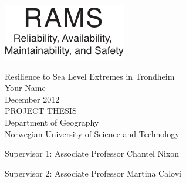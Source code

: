 \thispagestyle{empty}
\includegraphics[scale=1.1]{fig/rams}
\mbox{}\\[6pc]
\begin{center}
\Huge{Resilience to Sea Level Extremes in Trondheim}\\[2pc]

\Large{Your Name}\\[1pc]
\large{December 2012}\\[2pc]

PROJECT THESIS\\
Department of Geography\\
Norwegian University of Science and Technology
\end{center}
\vfill

\noindent Supervisor 1: Associate Professor Chantel Nixon

\noindent Supervisor 2: Associate Professor Martina Calovi

